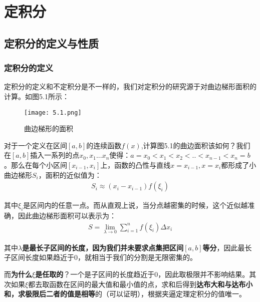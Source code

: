 \documentclass{ctexart}
\let\oldtextbf\textbf %
\renewcommand{\textbf}[1]{\textcolor{btex}{\oldtextbf{#1}}} %
\begin{document}
\section{定积分}
\subsection{定积分的定义与性质}
\subsubsection{定积分的定义}
定积分的定义和不定积分是不一样的，我们对定积分的研究源于对曲边梯形面积的计算。如图5.1所示：
\begin{figure}[H]    
\centering     
\renewcommand{\figurename}{图}     
\renewcommand{\thefigure}{5.1}    
\begin{myimagebox}[width=0.45\textwidth] %
\texttt{[image: 5.1.png]} %
\end{myimagebox}     
\caption{\label{fig:5.1}曲边梯形的面积}   
\end{figure}

对于一个定义在区间$[a,b]$的连续函数$f(x)$,计算图5.1的曲边面积该如何？我们在$[a,b]$插入一系列的点$x_0,x_1...x_n$使得：$a=x_0<x_1<x_2<..<x_{n-1}<x_n=b$。那么在每个小区间$[x_{i-1},x_i]$上，函数的凸性与直线$x=x_{i-1},x=x_{i}$都形成了小曲边梯形$S_i$，面积的近似值为：
\begin{align*}
    S_i\approx (x_{i}-x_{i-1})f(\xi_i)
\end{align*}

其中$\xi_i$是区间内的任意一点。而从直观上说，当分点越密集的时候，这个近似越准确，因此曲边梯形面积可以表示为：
\begin{align*}
    S=\lim_{\lambda\to 0}\sum_{i=1}^n f(\xi_i)\Delta x_i
\end{align*}

其中\textbf{$\lambda$是最长子区间的长度，因为我们并未要求点集把区间$[a,b]$等分}，因此最长子区间长度如果趋近于0，就相当于我们的分割是无限密集的。

而\textbf{为什么$\xi$是任取的}？一个是子区间的长度趋近于0，因此取极限并不影响结果。其次如果$\xi$都去取函数在区间的最大值和最小值的点，求和后得到\textbf{达布大和与达布小和，求极限后二者的值是相等}的（可以证明），根据夹逼定理定积分的值唯一。
\end{document}
